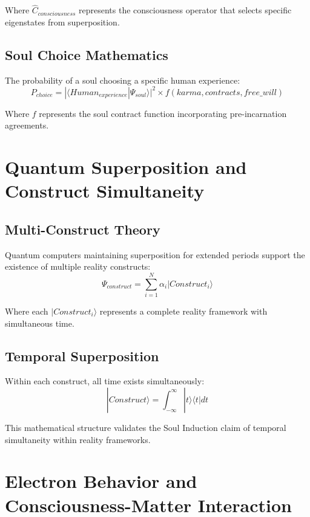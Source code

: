 \documentclass[12pt,a4paper]{article}
\begin{document}
Where $\hat{C}_{consciousness}$ represents the consciousness operator that selects specific eigenstates from superposition.

\subsection{Soul Choice Mathematics}
The probability of a soul choosing a specific human experience:
\begin{equation}
P_{choice} = |\langle Human_{experience}|\Psi_{soul}\rangle|^2 \times f(karma, contracts, free\_will)
\end{equation}

Where $f$ represents the soul contract function incorporating pre-incarnation agreements.

\section{Quantum Superposition and Construct Simultaneity}

\subsection{Multi-Construct Theory}
Quantum computers maintaining superposition for extended periods \cite{google2024} support the existence of multiple reality constructs:
\begin{equation}
\Psi_{construct} = \sum_{i=1}^N \alpha_i|Construct_i\rangle
\end{equation}

Where each $|Construct_i\rangle$ represents a complete reality framework with simultaneous time.

\subsection{Temporal Superposition}
Within each construct, all time exists simultaneously:
\begin{equation}
|Construct\rangle = \int_{-\infty}^\infty |t\rangle\langle t| dt
\end{equation}

This mathematical structure validates the Soul Induction claim of temporal simultaneity within reality frameworks.

\section{Electron Behavior and Consciousness-Matter Interaction}
\end{document}
